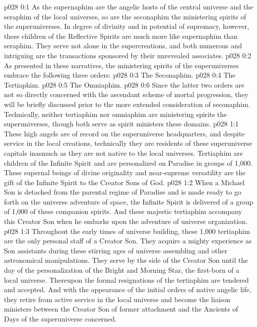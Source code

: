 \author{Mighty Messenger}
\vs p028 0:1 As the supernaphim are the angelic hosts of the central universe and the seraphim of the local universes, so are the seconaphim the ministering spirits of the superuniverses. In degree of divinity and in potential of supremacy, however, these children of the Reflective Spirits are much more like supernaphim than seraphim. They serve not alone in the supercreations, and both numerous and intriguing are the transactions sponsored by their unrevealed associates.
\vs p028 0:2 \pc As presented in these narratives, the ministering spirits of the superuniverses embrace the following three orders:
\vs p028 0:3 \bibnobreakspace The Seconaphim.
\vs p028 0:4 \bibnobreakspace The Tertiaphim.
\vs p028 0:5 \bibnobreakspace The Omniaphim.
\vs p028 0:6 \pc Since the latter two orders are not so directly concerned with the ascendant scheme of mortal progression, they will be briefly discussed prior to the more extended consideration of seconaphim. Technically, neither tertiaphim nor omniaphim are ministering spirits  the superuniverses, though both serve as spirit ministers  these domains.
\vs p028 1:1 These high angels are of record on the superuniverse headquarters, and despite service in the local creations, technically they are residents of these superuniverse capitals inasmuch as they are not native to the local universes. Tertiaphim are children of the Infinite Spirit and are personalized on Paradise in groups of 1,000. These supernal beings of divine originality and near\hyp{}supreme versatility are the gift of the Infinite Spirit to the Creator Sons of God.
\vs p028 1:2 When a Michael Son is detached from the parental regime of Paradise and is made ready to go forth on the universe adventure of space, the Infinite Spirit is delivered of a group of 1,000 of these companion spirits. And these majestic tertiaphim accompany this Creator Son when he embarks upon the adventure of universe organization.
\vs p028 1:3 Throughout the early times of universe building, these 1,000 tertiaphim are the only personal staff of a Creator Son. They acquire a mighty experience as Son assistants during these stirring ages of universe assembling and other astronomical manipulations. They serve by the side of the Creator Son until the day of the personalization of the Bright and Morning Star, the first\hyp{}born of a local universe. Thereupon the formal resignations of the tertiaphim are tendered and accepted. And with the appearance of the initial orders of native angelic life, they retire from active service in the local universe and become the liaison ministers between the Creator Son of former attachment and the Ancients of Days of the superuniverse concerned.
